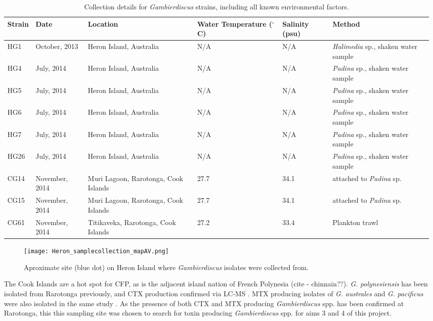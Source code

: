 \documentclass[12pt]{article}
\begin{document}
\FloatBarrier
\begin{table}
\caption{Collection details for \emph{Gambierdiscus} strains, including all known environmental factors.}
\label{tbl:StrainTable}
\begin{tabular}{ | p{1.1cm} | p{1.8cm} | p{3cm} | p{2.5cm} | p{1.8cm} | p{4cm} | }
\hline
\textbf{Strain} & \textbf{Date} & \textbf{Location} & \textbf{Water Temperature ($^{\circ}$C)} & \textbf{Salinity (psu)} & \textbf{Method} \\
 \hline
 HG1 & October, 2013 & Heron Island, Australia & N/A & N/A & \emph{Halimedia} sp., shaken water sample \\
  \hline
  HG4  & July, 2014 & Heron Island, Australia &  N/A & N/A & \emph{Padina} sp., shaken water sample  \\
  \hline
  HG5  & July, 2014 & Heron Island, Australia &  N/A & N/A & \emph{Padina} sp., shaken water sample \\
  \hline
  HG6  & July, 2014 & Heron Island, Australia &  N/A & N/A & \emph{Padina} sp., shaken water sample  \\
  \hline
  HG7  & July, 2014 & Heron Island, Australia &  N/A & N/A & \emph{Padina} sp., shaken water sample  \\
  \hline
  HG26  & July, 2014 & Heron Island, Australia & N/A & N/A & \emph{Padina} sp., shaken water sample  \\
  \hline
  CG14  & November, 2014 & Muri Lagoon, Rarotonga, Cook Islands & 27.7 & 34.1 & attached to \emph{Padina} sp. \\
  \hline
  CG15  & November, 2014 & Muri Lagoon, Rarotonga, Cook Islands & 27.7 & 34.1 & attached to \emph{Padina} sp. \\
  \hline
  CG61  & November, 2014 & Titikaveka, Rarotonga, Cook Islands & 27.2 & 33.4 & Plankton trawl \\
  \hline
\end{tabular}
\end{table}
\FloatBarrier

\FloatBarrier
\begin{figure} 
\texttt{[image: Heron\_samplecollection\_mapAV.png]} 
\caption{Aproximate site (blue dot) on Heron Island where \textit{Gambierdiscus} isolates were collected from.} 
\label{fig:HeroSam}
\end{figure} 
\FloatBarrier
 
The Cook Islands are a hot spot for CFP,  as is the adjacent island nation of French Polynesia (cite - chinnain??). \emph{G. polynesiensis} has been isolated from Rarotonga previously, and CTX production confirmed via LC-MS \cite{rhodes2014production}.
MTX producing isolates of \emph{G. australes} and \emph{G. pacificus} were also isolated in the same study \cite{rhodes2014production}.
As the presence of both CTX and MTX producing \emph{Gambierdiscus} spp. has been confirmed at Rarotonga, this this sampling site was chosen to search for toxin producing \emph{Gambierdiscus} spp. for aims 3 and 4 of this project.\\
\end{document}
